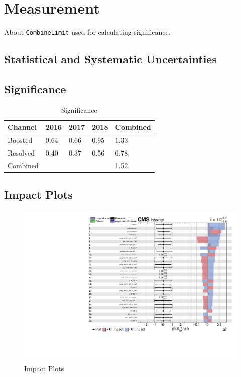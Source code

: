 \clearpage
\section{
  Measurement
 }

About \texttt{CombineLimit} used for calculating significance.

\subsection{
  Statistical and Systematic Uncertainties
}

\subsection{
  Significance
}

\begin{table}[!ht]
  \centering
  \caption{Significance}
  \begin{tabular}{lllll}%
    \toprule
    Channel  & 2016 & 2017 & 2018 & Combined \\
    \midrule
    Boosted  & 0.64 & 0.66 & 0.95 & 1.33     \\
    Resolved & 0.40 & 0.37 & 0.56 & 0.78     \\
    \midrule
    Combined &      &      &      & 1.52     \\
    \bottomrule
  \end{tabular}\label{tab:vbs-significance}
\end{table}

\clearpage
\subsection{
  Impact Plots
}
\begin{figure}[!ht]
  \centering
  \includegraphics[width=\textwidth,page=1]{analysis_plots/impact_plots/impacts_datacard_run2_z.pdf}
  \caption[Impact Plots]%
  {Impact Plots}%
  \label{fig:vbs-impact-plots-page1}
\end{figure}


